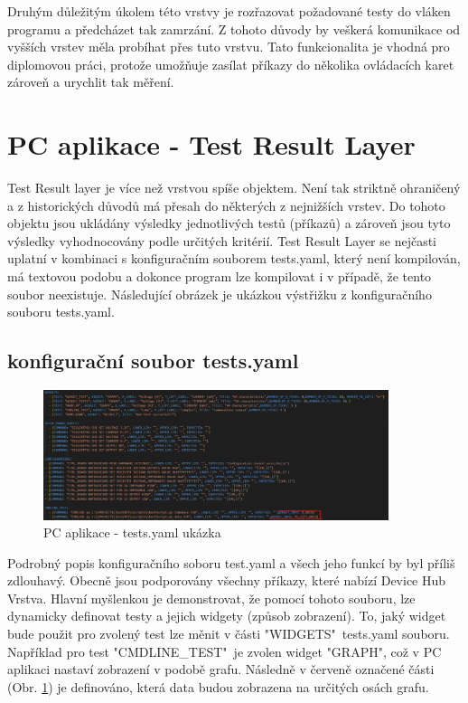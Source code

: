 Druhým důležitým úkolem této vrstvy je rozřazovat požadované testy do vláken programu a předcházet tak zamrzání.
Z tohoto důvody by veškerá komunikace od vyšších vrstev měla probíhat přes tuto vrstvu.
Tato funkcionalita je vhodná pro diplomovou práci, protože umožňuje zasílat příkazy do několika ovládacích karet zároveň a
urychlit tak měření.


\section{PC aplikace - Test Result Layer}
Test Result layer je více než vrstvou spíše objektem.
Není tak striktně ohraničený a z historických důvodů má přesah do některých z nejnižších vrstev.
Do tohoto objektu jsou ukládány výsledky jednotlivých testů (příkazů) a zároveň jsou tyto výsledky vyhodnocovány podle
určitých kritérií.
Test Result Layer se nejčasti uplatní v kombinaci s konfiguračním souborem tests.yaml, který není kompilován, má textovou podobu
a dokonce program lze kompilovat i v případě, že tento soubor neexistuje.
Následující obrázek je ukázkou výstřižku z konfiguračního souboru tests.yaml.

\subsection{konfigurační soubor tests.yaml}

\begin{figure}[ht!]
    \centering
    \includegraphics[width = 0.9\textwidth]{obrazky/test_result_class.png}
    \caption{PC aplikace - tests.yaml ukázka}
    \label{fig: tests yaml}
\end{figure}

Podrobný popis konfiguračního soboru test.yaml a všech jeho funkcí by byl příliš zdlouhavý.
Obecně jsou podporovány všechny příkazy, které nabízí Device Hub Vrstva.
Hlavní myšlenkou je demonstrovat, že pomocí tohoto souboru, lze dynamicky definovat testy a jejich widgety (způsob zobrazení). 
To, jaký widget bude použit pro zvolený test lze měnit v části "WIDGETS"\ tests.yaml souboru. Například pro test "CMDLINE\_TEST"\ je zvolen
widget "GRAPH", což v PC aplikaci nastaví zobrazení v podobě grafu.
Následně v červeně označené části (Obr. \ref{fig: tests yaml}) je definováno, která data budou zobrazena na určitých osách grafu.\\

